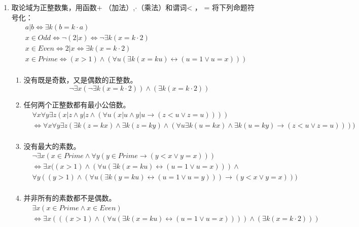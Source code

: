 \documentclass[UTF8]{ctexart}
\begin{document}
\begin{enumerate}
       \item 取论域为正整数集，用函数$+$ （加法）,$\cdot$（乘法）和谓词< ， = 将下列命题符号化：
       \[
           \begin{aligned}
                &a|b \Leftrightarrow \exists k(b=k\cdot a)\\
                &x\in Odd \Leftrightarrow \neg(2|x)\Leftrightarrow \neg \exists k(x=k\cdot 2)\\
                &x\in Even \Leftrightarrow 2|x \Leftrightarrow \exists k(x=k\cdot 2)\\
                &x\in Prime \Leftrightarrow (x>1)\wedge (\forall u(\exists k(x=ku)\leftrightarrow(u=1 \vee u=x)))\\
           \end{aligned}
       \]
       \begin{enumerate}
           \item 没有既是奇数，又是偶数的正整数。
           \[
               \neg \exists x(\neg \exists k(x=k\cdot 2)) \wedge (\exists k(x=k\cdot 2))
           \]
           \item 任何两个正整数都有最小公倍数。
           \[
                \begin{aligned}
                    &\forall x\forall y \exists z(x|z \wedge y|z \wedge (\forall u(x|u \wedge y|u \rightarrow (z<u \vee z=u))))\\
                    &\Leftrightarrow \forall x\forall y \exists z(\exists k(z=kx) \wedge \exists k(z=ky) \wedge (\forall u\exists k(u=kx) \wedge \exists k(u=ky) \rightarrow (z<u \vee z=u))))\\
                \end{aligned}
           \]
           \item 没有最大的素数。
           \[
               \begin{aligned}
                   &\neg \exists x(x\in Prime \wedge \forall y(y\in Prime \rightarrow(y<x \vee y=x)))\\
                   &\Leftrightarrow \exists x((x>1)\wedge (\forall u(\exists k(x=ku)\leftrightarrow(u=1 \vee u=x))) \wedge\\
                   &\forall y((y>1)\wedge (\forall u(\exists k(y=ku)\leftrightarrow(u=1 \vee u=y))) \rightarrow(y<x \vee y=x)))\\
                \end{aligned}
           \]
           \item 并非所有的素数都不是偶数。
           \[
               \begin{aligned}
                   &\exists x(x\in Prime \wedge x\in Even)\\
                   &\Leftrightarrow \exists x(((x>1)\wedge (\forall u(\exists k(x=ku)\leftrightarrow(u=1 \vee u=x)))) \wedge (\exists k(x=k\cdot 2)))
               \end{aligned}
           \]
       \end{enumerate}


\end{enumerate}
\end{document}
